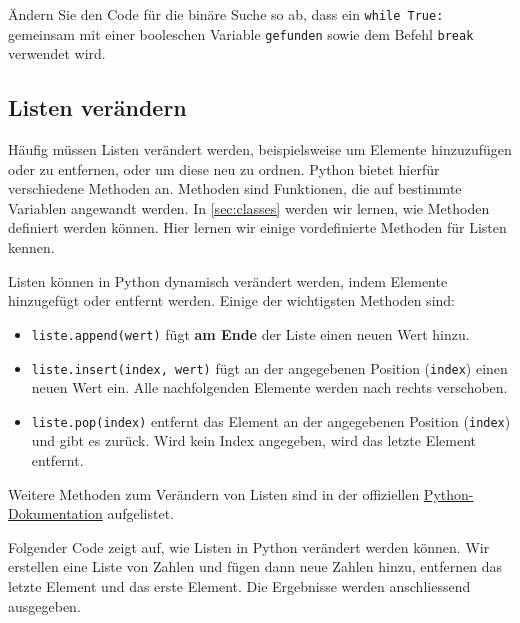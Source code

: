 \begin{myexercise}
	Ändern Sie den Code für die binäre Suche so ab, dass ein \lstinline|while True:| gemeinsam mit einer booleschen Variable \lstinline|gefunden| sowie dem Befehl \lstinline|break| verwendet wird.
	\begin{myanswer}
		
	\end{myanswer}
\end{myexercise}


\subsection{Listen verändern}

Häufig müssen Listen verändert werden, beispielsweise um Elemente hinzuzufügen oder zu entfernen, oder um diese neu zu ordnen. Python bietet hierfür verschiedene Methoden an. Methoden sind Funktionen, die auf bestimmte Variablen angewandt werden. In \cref{sec:classes} werden wir lernen, wie Methoden definiert werden können. Hier lernen wir einige vordefinierte Methoden für Listen kennen.

\begin{mydefinition}
	Listen können in Python dynamisch verändert werden, indem Elemente hinzugefügt oder entfernt werden. Einige der wichtigsten Methoden sind:
	\begin{itemize}
		\item \lstinline|liste.append(wert)| fügt \textbf{am Ende} der Liste einen neuen Wert hinzu.
		\item \lstinline|liste.insert(index, wert)| fügt an der angegebenen Position (\texttt{index}) einen neuen Wert ein. Alle nachfolgenden Elemente werden nach rechts verschoben.
		\item \lstinline|liste.pop(index)| entfernt das Element an der angegebenen Position (\texttt{index}) und gibt es zurück. Wird kein Index angegeben, wird das letzte Element entfernt.
	\end{itemize}
	Weitere Methoden zum Verändern von Listen sind in der offiziellen \href{https://docs.python.org/3/tutorial/datastructures.html#more-on-lists}{Python-Dokumentation} aufgelistet.
\end{mydefinition}


\begin{myexample}
	Folgender Code zeigt auf, wie Listen in Python verändert werden können. Wir erstellen eine Liste von Zahlen und fügen dann neue Zahlen hinzu, entfernen das letzte Element und das erste Element. Die Ergebnisse werden anschliessend ausgegeben.
	
\end{myexample}

